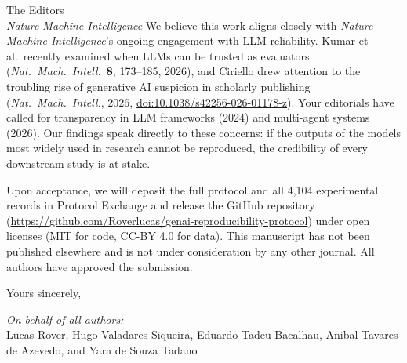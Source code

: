 \documentclass[11pt]{letter}
\begin{document}
\begin{letter}{The Editors\\
\textit{Nature Machine Intelligence}}
We believe this work aligns closely with \textit{Nature Machine Intelligence}'s ongoing engagement with LLM reliability. Kumar et al.\ recently examined when LLMs can be trusted as evaluators (\textit{Nat.\ Mach.\ Intell.}\ \textbf{8}, 173--185, 2026), and Ciriello drew attention to the troubling rise of generative AI suspicion in scholarly publishing (\textit{Nat.\ Mach.\ Intell.}, 2026, \href{https://doi.org/10.1038/s42256-026-01178-z}{doi:10.1038/s42256-026-01178-z}). Your editorials have called for transparency in LLM frameworks (2024) and multi-agent systems (2026). Our findings speak directly to these concerns: if the outputs of the models most widely used in research cannot be reproduced, the credibility of every downstream study is at stake.

Upon acceptance, we will deposit the full protocol and all 4,104 experimental records in Protocol Exchange and release the GitHub repository (\url{https://github.com/Roverlucas/genai-reproducibility-protocol}) under open licenses (MIT for code, CC-BY 4.0 for data). This manuscript has not been published elsewhere and is not under consideration by any other journal. All authors have approved the submission.

\closing{Yours sincerely,}

\vspace{-1cm}
\noindent\textit{On behalf of all authors:}\\
Lucas Rover, Hugo Valadares Siqueira, Eduardo Tadeu Bacalhau, Anibal Tavares de Azevedo, and Yara de Souza Tadano

\end{letter}
\end{document}
